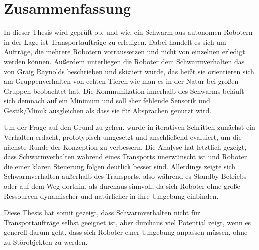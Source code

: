 \chapter*{Zusammenfassung}

In dieser Thesis wird geprüft ob, und wie, ein Schwarm aus autonomen Robotern in der Lage ist Transportaufträge zu erledigen. Dabei handelt es sich um Aufträge, die mehrere Robotern vorraussetzen und nicht von einzelnen erledigt werden können. Außerdem unterliegen die Roboter dem Schwarmverhalten das von Graig Raynolds beschrieben und skiziiert wurde, das heißt sie orientieren sich am Gruppenverhalten von echten Tieren wie man es in der Natur bei großen Gruppen beobachtet hat. Die Kommunikation innerhalb des Schwarms beläuft sich demnach auf ein Minimum und soll eher fehlende Sensorik und Gestik/Mimik ausgleichen als dass sie für Absprachen genutzt wird.

Um der Frage auf den Grund zu gehen, wurde in iterativen Schritten zunächst ein Verhalten erdacht, prototypisch umgesetzt und anschließend evaluiert, um die nächste Runde der Konzeption zu verbessern. Die Analyse hat letztlich gezeigt, dass Schwarmverhalten während eines Transports unerwünscht ist und Roboter die einer klaren Steuerung folgen deutlich besser sind. Allerdings zeigte sich Schwarmverhalten außerhalb des Transports, also während es Standby-Betriebs oder auf dem Weg dorthin, als durchaus sinnvoll, da sich Roboter ohne große Ressourcen dynamischer und natürlicher in ihre Umgebung einbinden.

Diese Thesis hat somit gezeigt, dass Schwarmverhalten nicht für Transportaufträge selbst geeignet ist, aber durchaus viel Potential zeigt, wenn es generell darum geht, dass sich Roboter einer Umgebung anpassen müssen, ohne zu Störobjekten zu werden.